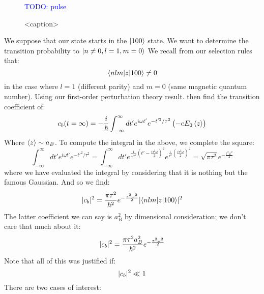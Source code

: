 \begin{figure}[htbp]
    \centering
    \textcolor{blue}{TODO: pulse}
    \caption{<caption>}
    \label{<label>}
\end{figure}
We suppose that our state starts in the $\lvert 100 \rangle$ state. We want to determine the transition probability to $\lvert n \neq 0, l = 1, m = 0 \rangle$ We recall from our selection rules that:
\begin{equation}
    \langle nlm \rvert z\lvert 100 \rangle \neq 0
\end{equation}
in the case where $l = 1$ (different parity) and $m = 0$ (same magnetic quantum number). Using our first-order perturbation theory result. then find the transition coefficient of:
\begin{equation}
    c_b(t = \infty) = -\frac{i}{\hbar} \int_{-\infty}^\infty dt' e^{i\omega t'} e^{-t'^2/\tau^2}\left(-eE_0\left< z \right>\right)
\end{equation}
Where $\left< z \right> \sim a_B$. To compute the integral in the above, we complete the square:
\begin{equation}
    \int_{-\infty}^\infty dt' e^{i\omega t'} e^{-t'^2/\tau^2} = \int_{-\infty}^\infty dt' e^{\frac{1}{-\tau^2}\left(t' - \frac{i\tau^2\omega}{2}\right)^2}e^{\frac{1}{\tau^2}\left(\frac{i\tau^2\omega}{2}\right)^2} = \sqrt{\pi \tau^2}e^{-\frac{\tau^2\omega^2}{4}}
\end{equation}
where we have evaluated the integral by considering that it is nothing but the famous Gaussian. And so we find:
\begin{equation}
    \lvert c_b \rvert^2 = \frac{\pi\tau^2}{\hbar^2}e^{-\frac{\tau^2\omega^2}{2}}\lvert \langle nlm \rvert z\lvert 100 \rangle \rvert^2
\end{equation}
The latter coefficient we can say is $a_B^2$ by dimensional consideration; we don't care that much about it:
\begin{equation}
    \lvert c_b \rvert^2 = \frac{\pi\tau^2a_B^2}{\hbar^2}e^{-\frac{\tau^2\omega^2}{2}}
\end{equation}
Note that all of this was justified if:
\begin{equation}
    \lvert c_b \rvert^2 \ll 1
\end{equation}
There are two cases of interest:
